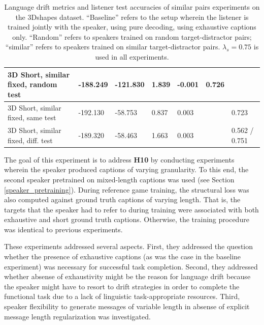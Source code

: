 \begin{table}[]
\begin{tabularx}{\textwidth}{|X|l|l|X|X|X|X|}
		3D Short, similar fixed, random test&      -188.249           &     -121.830                  &             1.839         &         -0.001             &                   0.726                       &                                        \\ \hline
		3D Short, similar fixed, same test&      -192.130      &     -58.753      &   0.837      & 0.003      &                       &               0.723                           \\ \hline
		3D Short, similar fixed, diff. test &  -189.320       & -58.463     & 1.663        &  0.003         &      &     0.562 / 0.751         \\ \hline
	\end{tabularx}
	\caption{\label{tab:3dshapes_drift_metrics_basic_short} Language drift metrics and listener test accuracies of similar pairs experiments on the 3Dshapes dataset. 
		``Baseline'' refers to the setup wherein the listener is trained jointly with the speaker, using pure decoding, using exhaustive captions only. ``Random'' refers to speakers trained on random target-distractor pairs; ``similar'' refers to speakers trained on similar target-distractor pairs. $\lambda_s = 0.75$ is used in all experiments.}
\end{table}

The goal of this experiment is to address \textbf{H10} by conducting experiments wherein the speaker produced captions of varying granularity.
To this end, the second speaker pretrained on mixed-length captions was used (see Section \ref{speaker_pretraining}). During reference game training, the structural loss was also computed against ground truth captions of varying length. That is, the targets that the speaker had to refer to during training were associated with both exhaustive and short ground truth captions. Otherwise, the training procedure was identical to previous experiments.

These experiments addressed several aspects. First, they addressed the question whether the presence of exhaustive captions (as was the case in the baseline experiment) was necessary for successful task completion. Second, they addressed whether absense of exhaustivity might be the reason for language drift because the speaker might have to resort to drift strategies in order to complete the functional task due to a lack of linguistic task-appropriate resources. 
Third, speaker flexibility to generate messages of variable length in absense of explicit message length regularization was investigated. 

